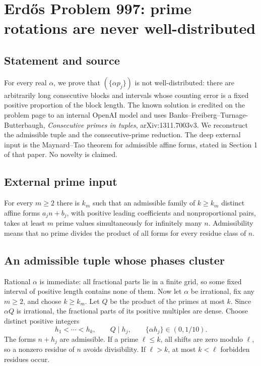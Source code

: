 \section*{Erd\H{o}s Problem 997: prime rotations are never well-distributed}
\subsection*{Statement and source}
For every real $\alpha$, we prove that $(\{\alpha p_j\})$ is not well-distributed: there are arbitrarily long consecutive blocks and intervals whose counting error is a fixed positive proportion of the block length.
The known solution is credited on the problem page to an internal OpenAI model and uses Banks--Freiberg--Turnage-Butterbaugh, \emph{Consecutive primes in tuples}, arXiv:1311.7003v3. We reconstruct the admissible tuple and the consecutive-prime reduction. The deep external input is the Maynard--Tao theorem for admissible affine forms, stated in Section 1 of that paper. No novelty is claimed.

\subsection*{External prime input}
For every $m\ge2$ there is $k_m$ such that an admissible family of $k\ge k_m$ distinct affine forms $a_jn+b_j$, with positive leading coefficients and nonproportional pairs, takes at least $m$ prime values simultaneously for infinitely many $n$. Admissibility means that no prime divides the product of all forms for every residue class of $n$.

\subsection*{An admissible tuple whose phases cluster}
Rational $\alpha$ is immediate: all fractional parts lie in a finite grid, so some fixed interval of positive length contains none of them.
Now let $\alpha$ be irrational, fix any $m\ge2$, and choose $k\ge k_m$.
Let $Q$ be the product of the primes at most $k$. Since $\alpha Q$ is irrational, the fractional parts of its positive multiples are dense. Choose distinct positive integers
\[
 h_1<\cdots<h_k,\qquad Q\mid h_j,\qquad \{\alpha h_j\}\in(0,1/10).
\]
The forms $n+h_j$ are admissible. If a prime $\ell\le k$, all shifts are zero modulo $\ell$, so a nonzero residue of $n$ avoids divisibility. If $\ell>k$, at most $k<\ell$ forbidden residues occur.


